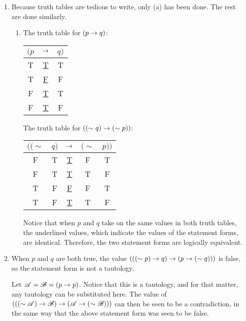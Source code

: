 \begin{enumerate}
  \item %
    Because truth tables are tedious to write, only (a) has been done. The rest are done similarly.
    \begin{enumerate}[(\alph*)]
      \item The truth table for \((p \rightarrow q)\):

        \begin{tabular}{ccc}
          \((p\)&
          \(\rightarrow\)&
          \(q)\)\\\hline

          T&
          \underline{T}&
          T\\

          T&
          \underline{F}&
          F\\

          F&
          \underline{T}&
          T\\

          F&
          \underline{T}&
          F
        \end{tabular}

        The truth table for \(((\sim q) \rightarrow (\sim p))\):

        \begin{tabular}{ccccc}
          \(((\sim\)&
          \(q)\)&
          \(\rightarrow\)&
          \((\sim\)&
          \(p))\)\\\hline

          F&
          T&
          \underline{T}&
          F&
          T\\

          F&
          T&
          \underline{T}&
          T&
          F\\

          T&
          F&
          \underline{F}&
          F&
          T\\

          T&
          F&
          \underline{T}&
          T&
          F
        \end{tabular}

        Notice that when \(p\) and \(q\) take on the same values in both truth tables, the underlined values, which indicate the values of the statement forms, are identical. Therefore, the two statement forms are logically equivalent.
    \end{enumerate}

  \item %
    When \(p\) and \(q\) are both true, the value \((((\sim p) \rightarrow q) \rightarrow (p \rightarrow (\sim q)))\) is false, so the statement form is not a tautology.

    Let \(\mathscr{A} = \mathscr{B} = (p \rightarrow p)\). Notice that this is a tautology, and for that matter, any tautology can be substituted here. The value of \((((\sim \mathscr{A}) \rightarrow \mathscr{B}) \rightarrow (\mathscr{A} \rightarrow (\sim \mathscr{B})))\) can then be seen to be a contradiction, in the same way that the above statement form was seen to be false.
\end{enumerate}

